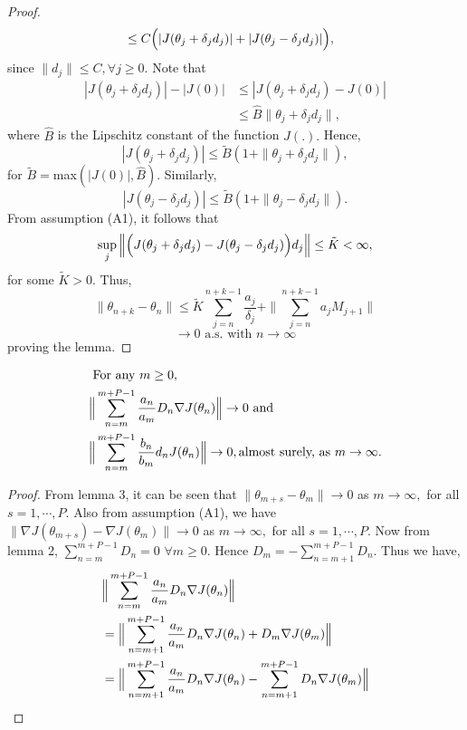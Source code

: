 \begin{lemma}
\begin{proof}
\begin{align*}
& \leq C \Big{(}|J(\theta_j+\delta_j d_j)|+|J(\theta_j-\delta_j d_j)|\Big{)},
\end{align*}
since $\|d_j\|\leq C, \forall j \geq0.$
Note that
\begin{align*}
|J(\theta_j+\delta_j d_j)|-|J(0)| & \leq|J(\theta_j+\delta_j d_j)-J(0)| \\
& \leq \hat{B} \|\theta_j+\delta_j d_j\|,
\end{align*}
where $\hat{B}$ is the Lipschitz constant of the function $J(.).$ Hence,
$$|J(\theta_j+\delta_j d_j)|\leq \tilde{B}(1+\|\theta_j+\delta_j d_j\|),$$
for $\tilde{B}=$max$(|J(0)|,\hat{B}).$ Similarly,
$$|J(\theta_j-\delta_j d_j)|\leq \tilde{B}(1+\|\theta_j-\delta_j d_j\|).$$
From assumption (A1), it follows that
$$\sup_j\Big{\|}\Big{(}J(\theta_j+\delta_j d_j)-J(\theta_j-\delta_j d_j)\Big{)}d_j\Big{\|}\leq \tilde{K}<\infty,$$
for some $\tilde{K}>0.$ Thus,
$$\|\theta_{n+k}-\theta_n\| \leq \tilde{K}\sum_{j=n}^{n+k-1}\frac{a_j}{\delta_j}+\|\sum_{j=n}^{n+k-1}a_jM_{j+1}\|$$
$$\rightarrow 0 \text{ a.s. with } n \rightarrow \infty$$
proving the lemma.
\end{proof}
\begin{lemma}
\begin{align*}
&\text{ For any } m \geq0,\\
&\Big{\|}\sum_{n=m}^{m+P-1}\frac{a_n}{a_m}D_n\nabla J(\theta_n)\Big{\|}\rightarrow 0 \text{ and }\\
&\Big{\|}\sum_{n=m}^{m+P-1}\frac{b_n}{b_m}d_nJ(\theta_n)\Big{\|}\rightarrow 0,
\text{almost surely, as } m \rightarrow \infty.
\end{align*}
\end{lemma}
\begin{proof}
 From lemma 3, it can be seen that
  $\|\theta_{m+s}-\theta_{m}\|\rightarrow 0$ as $m\rightarrow \infty,$
 for all $s=1,\cdots,P.$ Also from assumption (A1), we have
 $\|\nabla J(\theta_{m+s})-\nabla J(\theta_{m})\|\rightarrow 0$ as $m\rightarrow \infty,$
 for all $s=1,\cdots,P.$ Now from lemma 2, $\sum\limits_{n=m}^{m+P-1}D_n=0$ $\forall m\geq0.$
 Hence $D_m=-\sum\limits_{n=m+1}^{m+P-1}D_n.$ Thus we have, 
 \begin{align*}
  &\Big{\|}\sum_{n=m}^{m+P-1}\frac{a_n}{a_m}D_n\nabla J(\theta_n)\Big{\|}\\
  & = \Big{\|}\sum_{n=m+1}^{m+P-1}\frac{a_n}{a_m}D_n\nabla J(\theta_n)
  +D_{m}\nabla J(\theta_{m})\Big{\|}\\
  &=\Big{\|}\sum_{n=m+1}^{m+P-1}\frac{a_n}{a_m}D_n \nabla J(\theta_n)
     -\sum_{n=m+1}^{m+P-1}D_n\nabla J(\theta_{m})\Big{\|}\\

\end{align*}
\end{proof}
\end{lemma}
